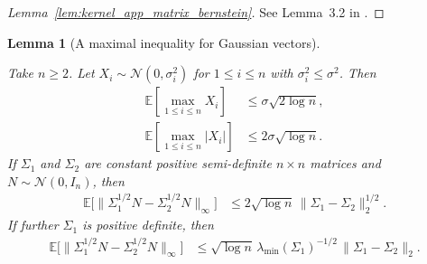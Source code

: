 \documentclass[11pt,lof]{puthesis}
\newcommand{\E}{\ensuremath{\mathbb{E}}}
\newcommand{\cN}{\ensuremath{\mathcal{N}}}
\theoremstyle{break}
\newtheorem{lemma}{Lemma}[section]
\theoremstyle{proof}
\newtheorem{proof}{Proof}
\begin{document}
\begin{proof}[Lemma~\ref{lem:kernel_app_matrix_bernstein}]

  See Lemma~3.2 in \citet{minsker2019moment}.
\end{proof}

\begin{lemma}[A maximal inequality for Gaussian vectors]
  \label{lem:kernel_app_gaussian_vector_maximal}

  Take $n \geq 2$.
  Let $X_i \sim \cN(0, \sigma_i^2)$
  for $1 \leq i \leq n$
  with $\sigma_i^2 \leq \sigma^2$.
  Then
  \begin{align}
    \label{eq:kernel_app_gaussian_vector_maximal}
    \E\left[
      \max_{1 \leq i \leq n}
      X_i
    \right]
    &\leq
    \sigma \sqrt{2 \log n}, \\
    \label{eq:kernel_app_gaussian_vector_maximal_abs}
    \E\left[
      \max_{1 \leq i \leq n}
      |X_i|
    \right]
    &\leq
    2 \sigma \sqrt{\log n}.
  \end{align}
  If $\Sigma_1$ and $\Sigma_2$ are constant
  positive semi-definite $n \times n$ matrices
  and $N \sim \cN(0,I_n)$,
  then
  \begin{align}
    \label{eq:kernel_app_gaussian_difference_psd}
    \E\Big[
      \big\|
      \Sigma_1^{1/2} N
      - \Sigma_2^{1/2} N
      \big\|_\infty
    \Big]
    &\leq
    2 \sqrt{\log n} \,
    \big\|
    \Sigma_1 - \Sigma_2
    \big\|_2^{1/2}.
  \end{align}
  If further $\Sigma_1$ is
  positive definite,
  then
  \begin{align}
    \label{eq:kernel_app_gaussian_difference_pd}
    \E\Big[
      \big\|
      \Sigma_1^{1/2} N
      - \Sigma_2^{1/2} N
      \big\|_\infty
    \Big]
    &\leq
    \sqrt{\log n} \,
    \lambda_{\min}(\Sigma_1)^{-1/2} \,
    \big\|
    \Sigma_1 - \Sigma_2
    \big\|_2.
  \end{align}

\end{lemma}
\end{document}
